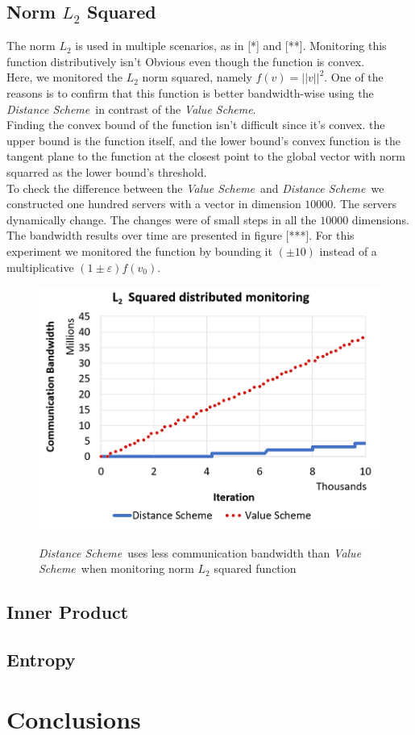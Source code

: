 \documentclass[10pt, conference]{IEEEtran}
\newcommand{\valueScheme}{\textit{Value Scheme}}
\newcommand{\distanceScheme}{\textit{Distance Scheme}}
\begin{document}
\subsection{Norm $L_2$ Squared}
The norm $L_2$ is used in multiple scenarios, as in [*] and [**]. Monitoring this function distributively isn't Obvious even though the function is convex. \\
Here, we monitored the $L_2$ norm squared, namely $f(v) = ||v||^2$. One of the reasons is to confirm that this function is better bandwidth-wise using the \distanceScheme \ in contrast of the \valueScheme . \\
Finding the convex bound of the function isn't difficult since it's convex. the upper bound is the function itself, and the lower bound's convex function is the tangent plane to the function at the closest point to the global vector with norm squarred as the lower bound's threshold. \\
To check the difference between the \valueScheme \ and \distanceScheme \ we constructed one hundred servers with a vector in dimension $\num[group-separator={,}]{10000}$. The servers dynamically change. The changes were of small steps in all the $\num[group-separator={,}]{10000}$ dimensions. \\
The bandwidth results over time are presented in figure [***]. For this experiment we monitored the function by bounding it ${(\pm 10)}$ instead of a multiplicative ${(1 \pm \varepsilon)f(v_0)}$.
\begin{figure}[t]
\includegraphics[width=\linewidth]{Pics/Sphere.PNG}
\label{SphereMonitoring}
\caption{\distanceScheme \ uses less communication bandwidth than \valueScheme \ when monitoring norm $L_2$ squared function}
\end{figure} 
\subsection{Inner Product}
\subsection{Entropy}

\section{Conclusions}




\end{document}
